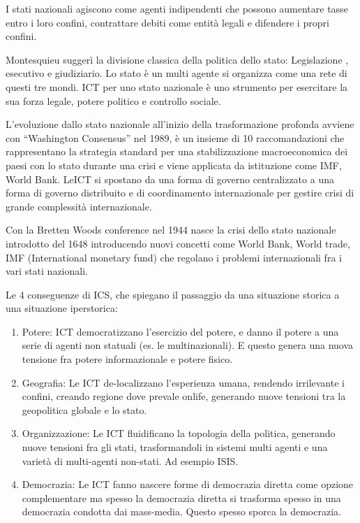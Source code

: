 \documentclass[a4page, 11pt]{article}
\begin{document}
I stati nazionali agiscono come agenti indipendenti che possono
aumentare tasse entro i loro confini, contrattare debiti come entità
legali e difendere i propri confini.

Montesquieu suggerì la divisione classica della politica dello stato:
Legislazione , esecutivo e giudiziario. Lo stato è un multi agente si
organizza come una rete di questi tre mondi. ICT per uno stato nazionale
è uno strumento per esercitare la sua forza legale, potere politico e
controllo sociale.

L'evoluzione dallo stato nazionale all'inizio della trasformazione
profonda avviene con ``Washington Consensus'' nel 1989, è un insieme di
10 raccomandazioni che rappresentano la strategia standard per una
stabilizzazione macroeconomica dei paesi con lo stato durante una crisi
e viene applicata da istituzione come IMF, World Bank. LeICT si spostano
da una forma di governo centralizzato a una forma di governo distribuito
e di coordinamento internazionale per gestire crisi di grande
complessità internazionale.

Con la Bretten Woods conference nel 1944 nasce la crisi dello stato
nazionale introdotto del 1648 introducendo nuovi concetti come World
Bank, World trade, IMF (International monetary fund) che regolano i
problemi internazionali fra i vari stati nazionali.

Le 4 conseguenze di ICS, che spiegano il passaggio da una situazione
storica a una situazione iperstorica:

\begin{enumerate}
	\def\labelenumi{\arabic{enumi})}
	 
	\item
	Potere: ICT democratizzano l'esercizio del potere, e danno il potere a
	una serie di agenti non statuali (es. le multinazionali). E questo
	genera una nuova tensione fra potere informazionale e potere fisico.
	\item
	Geografia: Le ICT de-localizzano l'esperienza umana, rendendo
	irrilevante i confini, creando regione dove prevale onlife, generando
	nuove tensioni tra la geopolitica globale e lo stato.
	\item
	Organizzazione: Le ICT fluidificano la topologia della politica,
	generando nuove tensioni fra gli stati, trasformandoli in sistemi
	multi agenti e una varietà di multi-agenti non-stati. Ad esempio ISIS.
	\item
	Democrazia: Le ICT fanno nascere forme di democrazia diretta come
	opzione complementare ma spesso la democrazia diretta si trasforma
	spesso in una democrazia condotta dai mass-media. Questo spesso sporca
	la democrazia.
\end{enumerate}
\end{document}

